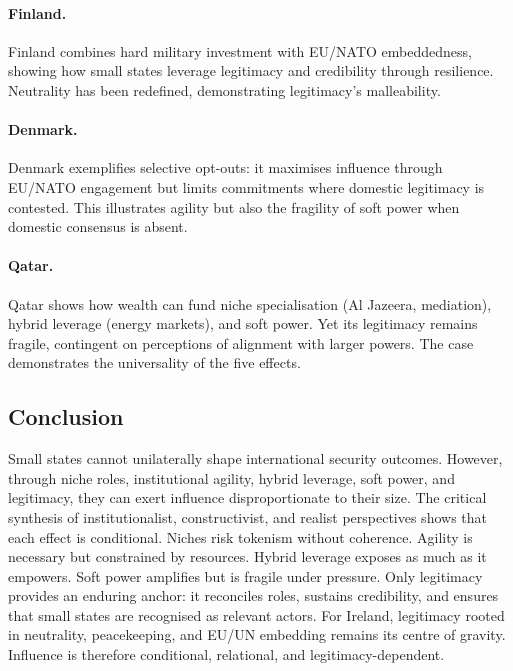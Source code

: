 \paragraph{Finland.}  
Finland combines hard military investment with EU/NATO embeddedness, showing how small states leverage legitimacy and credibility through resilience. Neutrality has been redefined, demonstrating legitimacy’s malleability.

\paragraph{Denmark.}  
Denmark exemplifies selective opt-outs: it maximises influence through EU/NATO engagement but limits commitments where domestic legitimacy is contested. This illustrates agility but also the fragility of soft power when domestic consensus is absent.

\paragraph{Qatar.}  
Qatar shows how wealth can fund niche specialisation (Al Jazeera, mediation), hybrid leverage (energy markets), and soft power. Yet its legitimacy remains fragile, contingent on perceptions of alignment with larger powers. The case demonstrates the universality of the five effects.

\subsection*{Conclusion}
Small states cannot unilaterally shape international security outcomes. However, through niche roles, institutional agility, hybrid leverage, soft power, and legitimacy, they can exert influence disproportionate to their size. The critical synthesis of institutionalist, constructivist, and realist perspectives shows that each effect is conditional. Niches risk tokenism without coherence. Agility is necessary but constrained by resources. Hybrid leverage exposes as much as it empowers. Soft power amplifies but is fragile under pressure. Only legitimacy provides an enduring anchor: it reconciles roles, sustains credibility, and ensures that small states are recognised as relevant actors. For Ireland, legitimacy rooted in neutrality, peacekeeping, and EU/UN embedding remains its centre of gravity. Influence is therefore conditional, relational, and legitimacy-dependent.

